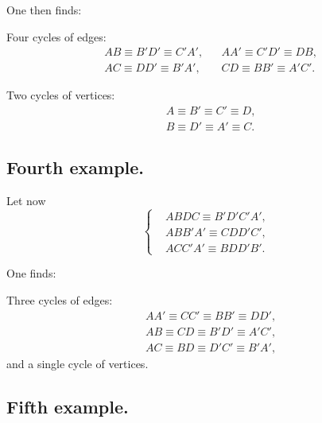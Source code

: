 \documentclass{article}
\begin{document}
One then finds:

Four cycles of edges:
\[ \begin{aligned} &AB \equiv B'D' \equiv C'A', &&AA' \equiv C'D' \equiv DB,\\ &AC \equiv DD' \equiv B'A', &&CD \equiv BB' \equiv A'C'. \end{aligned} \]

Two cycles of vertices:
\[ \begin{aligned} &A \equiv B' \equiv C' \equiv D,\\ &B \equiv D' \equiv A' \equiv C. \end{aligned} \]

\subsection*{Fourth example.}

Let now
\[ \left\{ \begin{aligned} &ABDC \equiv B'D'C'A',\\ &ABB'A' \equiv CDD'C',\\ &ACC'A' \equiv BDD'B'. \end{aligned} \right. \tag{5} \]

One finds:

Three cycles of edges:
\[ \begin{aligned} &AA' \equiv CC' \equiv BB' \equiv DD',\\ &AB \equiv CD \equiv B'D' \equiv A'C',\\ &AC \equiv BD \equiv D'C' \equiv B'A', \end{aligned} \]
and a single cycle of vertices.

\subsection*{Fifth example.}
\end{document}
